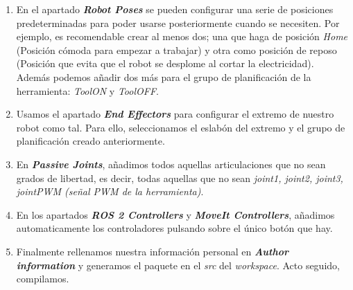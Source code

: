 \begin{enumerate}
\item En el apartado \textbf{\textit{\guillemotleft Robot Poses\guillemotright}} se pueden configurar una serie de posiciones predeterminadas 
para poder usarse posteriormente cuando se necesiten. Por ejemplo, es recomendable crear al menos dos; una que haga de posición \textit{Home} 
(Posición cómoda para empezar a trabajar) y otra como posición de reposo (Posición que evita que el robot se desplome al cortar la electricidad). Además 
podemos añadir dos más para el grupo de planificación de la herramienta: \textit{ToolON} y \textit{ToolOFF}.

\item Usamos el apartado \textbf{\textit{\guillemotleft End Effectors \guillemotright}} para configurar el extremo de nuestro robot como tal. Para ello, 
seleccionamos el eslabón del extremo y el grupo de planificación creado anteriormente. 

\item En \textbf{\textit{\guillemotleft Passive Joints\guillemotright}}, añadimos todos aquellas articulaciones que no sean grados de libertad, 
es decir, todas aquellas que no sean \textit{joint1, joint2, joint3, jointPWM (señal PWM de la herramienta)}.

\item En los apartados \textbf{\textit{\guillemotleft ROS 2 Controllers\guillemotright}} y 
\textbf{\textit{\guillemotleft MoveIt Controllers\guillemotright}}, añadimos automaticamente los controladores pulsando sobre el único botón que hay.

\item Finalmente rellenamos nuestra información personal en \textbf{\textit{\guillemotleft Author information\guillemotright}} y generamos el 
paquete en el \textit{src} del \textit{workspace}. Acto seguido, compilamos.
\end{enumerate}

